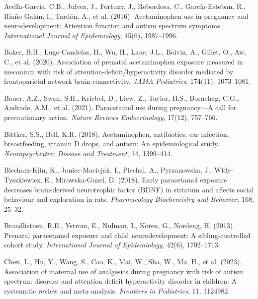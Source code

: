 \documentclass[12pt]{article}
\begin{document}
\begin{thebibliography}{99}

Avella-Garcia, C.B., Julvez, J., Fortuny, J., Rebordosa, C., García-Esteban, R., Riaño Galán, I., Tardón, A., et al. (2016).
Acetaminophen use in pregnancy and neurodevelopment: Attention function and autism spectrum symptoms.
\textit{International Journal of Epidemiology}, 45(6), 1987--1996.

Baker, B.H., Lugo-Candelas, H., Wu, H., Laue, J.L., Boivin, A., Gillet, O., Aw, C., et al. (2020).
Association of prenatal acetaminophen exposure measured in meconium with risk of attention-deficit/hyperactivity disorder mediated by frontoparietal network brain connectivity.
\textit{JAMA Pediatrics}, 174(11), 1073--1081.

Bauer, A.Z., Swan, S.H., Kriebel, D., Liew, Z., Taylor, H.S., Bornehag, C.G., Andrade, A.M., et al. (2021).
Paracetamol use during pregnancy---A call for precautionary action.
\textit{Nature Reviews Endocrinology}, 17(12), 757--766.

Bittker, S.S., Bell, K.R. (2018).
Acetaminophen, antibiotics, ear infection, breastfeeding, vitamin D drops, and autism: An epidemiological study.
\textit{Neuropsychiatric Disease and Treatment}, 14, 1399--414.

Blecharz-Klin, K., Joniec-Maciejak, I., Piechal, A., Pyrzanowska, J., Widy-Tyszkiewicz, E., Mirowska-Guzel, D. (2018).
Early paracetamol exposure decreases brain-derived neurotrophic factor (BDNF) in striatum and affects social behaviour and exploration in rats.
\textit{Pharmacology Biochemistry and Behavior}, 168, 25--32.

Brandlistuen, R.E., Ystrom, E., Nulman, I., Koren, G., Nordeng, H. (2013).
Prenatal paracetamol exposure and child neurodevelopment: A sibling-controlled cohort study.
\textit{International Journal of Epidemiology}, 42(6), 1702--1713.

Chen, L., Hu, Y., Wang, S., Cao, K., Mai, W., Sha, W., Ma, H., et al. (2023).
Association of maternal use of analgesics during pregnancy with risk of autism spectrum disorder and attention deficit hyperactivity disorder in children: A systematic review and meta-analysis.
\textit{Frontiers in Pediatrics}, 11, 1124982.


\end{thebibliography}
\end{document}
